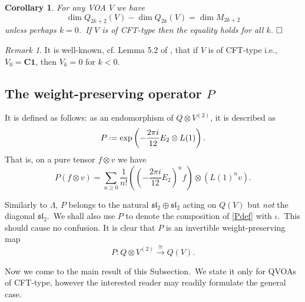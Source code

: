 \documentclass[12pt]{amsart}
\theoremstyle{plain}
\newtheorem{cor}[thm]{Corollary}
\theoremstyle{definition}
\theoremstyle{remark}
\newtheorem{rmk}[thm]{Remark}
\newcommand*{\df}{\mathrel{\vcenter{\baselineskip0.5ex \lineskiplimit0pt
                     \hbox{\scriptsize.}\hbox{\scriptsize.}}} =}
\newcommand{\CC}{\mathbf{C}}
\newcommand{\bone}{\mathbf{1}}
\begin{document}
\begin{cor}\label{cor710}
For any VOA $V$ we have
$$\dim Q_{2k+2}(V)-\dim Q_{2k}(V) = \dim M_{2k+2}$$
unless perhaps $k=0$.\ If $V$ is of CFT-type then the equality holds for all $k$.
$\hfill\Box$
\end{cor}

\begin{rmk}
It is well-known, cf. Lemma 5.2 of \cite{DMshifted}, that if $V$ is of CFT-type i.e., $V_0=\CC\bone$, then $V_k=0$ for $k<0$.
\end{rmk}
\subsection{The weight-preserving operator \texorpdfstring{$P$}{P}}\label{SSP}

It is defined as follows: as an endomorphism of $Q\otimes V^{(2)}$, it is described as
\begin{align}
\label{Pdef}
    P\df \exp\left(-\frac{2\pi i}{12} E_2 \otimes L(1)\right).
\end{align}
That is, on a pure tensor $f\otimes v$ we have
\[
P(f\otimes v) = \sum_{n\geq 0}\frac{1}{n!}\left(\left(-\frac{2\pi i}{12} E_2\right)^n f\right) \otimes \left(L(1)^nv\right).
\]

Similarly to $\Lambda$, $P$ belongs to the natural $\mathfrak{sl}_2\oplus\mathfrak{sl}_2$ acting on $Q(V)$ but \emph{not} the diagonal $\mathfrak{sl}_2$.\ We shall also use $P$ to denote the composition of \eqref{Pdef} with $\iota$.\ This should cause no confusion.
It is clear that $P$ is an invertible weight-preserving map 
\[
P\colon Q \otimes V^{(2)} \stackrel{\cong}{\longrightarrow} Q(V).
\]

Now we come to the main result of this Subsection.\ We state it only for QVOAs of CFT-type, however the interested reader may readily formulate the general case.
\end{document}
